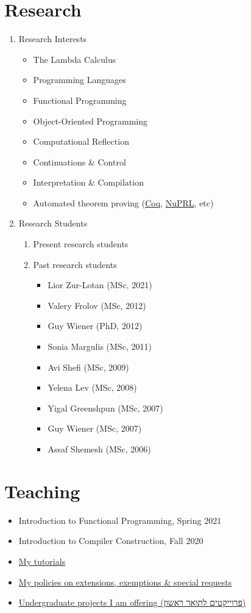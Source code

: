 \documentclass[11pt]{article}
\begin{document}
\section{Research}
\label{sec:orga32323c}
\begin{enumerate}
\item Research Interests
\label{sec:org44b2f54}
\begin{itemize}
\item The Lambda Calculus
\item Programming Languages
\item Functional Programming
\item Object-Oriented Programming
\item Computational Reflection
\item Continuations \& Control
\item Interpretation \& Compilation
\item Automated theorem proving (\href{./coq.html}{Coq}, \href{http://www.nuprl.org/}{NuPRL}, etc)
\end{itemize}
\item Research Students
\label{sec:orgcad0b0a}
\begin{enumerate}
\item Present research students
\label{sec:org7332294}
\item Past research students
\label{sec:orgaa6d14d}
\begin{itemize}
\item Lior Zur-Lotan (MSc, 2021)
\item Valery Frolov (MSc, 2012)
\item Guy Wiener (PhD, 2012)
\item Sonia Margulis (MSc, 2011)
\item Avi Shefi (MSc, 2009)
\item Yelena Lev (MSc, 2008)
\item Yigal Greenshpun (MSc, 2007)
\item Guy Wiener (MSc, 2007)
\item Assaf Shemesh (MSc, 2006)
\end{itemize}
\end{enumerate}
\end{enumerate}

\section{Teaching}
\label{sec:org70825ef}
\begin{itemize}
\item Introduction to Functional Programming, Spring 2021
\item Introduction to Compiler Construction, Fall 2020
\item \href{./tutorials.html}{My tutorials}
\item \href{./special.html}{My policies on extensions, exemptions \& special requests}
\item \href{./projects.html}{Undergraduate projects I am offering (פרוייקטים לתואר ראשון)}
\end{itemize}
\end{document}
